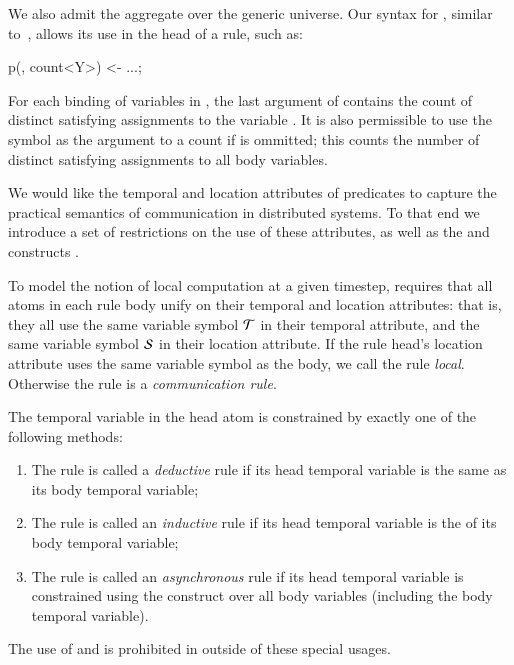We also admit the  aggregate over the generic universe.  Our syntax for , similar to~\cite{datalog-agg}, allows its use in the head of a rule, such as:

\begin{Dedalus}
p(, count<Y>) <- ...;
\end{Dedalus}

For each binding of variables in , the last argument of  contains the count of distinct satisfying assignments to the variable .  It is also permissible to use the symbol \dedalus{*} as the argument to a count if  is ommitted; this counts the number of distinct satisfying assignments to all body variables.


\vspace{1em}
We would like the temporal and location attributes of \lang predicates to capture the practical semantics of communication in distributed systems.  To that end we introduce a set of restrictions on the use of these attributes, as well as the  and  constructs .

To model the notion of local computation at a given timestep, \lang requires that all atoms in each rule body unify on their temporal and location attributes: that is, they all use the same variable symbol $\Tau$ in their temporal attribute, and the same variable symbol $\SDedalus$ in their location attribute.  If the rule head's location attribute uses the same variable symbol as the body, we call the rule {\em local}.  Otherwise the rule is a {\em communication rule}.

The temporal variable in the head atom is constrained by exactly one of the following methods:
\begin{enumerate}
\item The rule is called a {\em deductive} rule if its head temporal variable is the same as its body temporal variable;
\item The rule is called an {\em inductive} rule if its head temporal variable is the  of its body temporal variable;
\item The rule is called an {\em asynchronous} rule if its head temporal variable is constrained using the  construct over all body variables (including the body temporal variable).
\end{enumerate}
The use of  and  is prohibited in \lang outside of these special usages.


